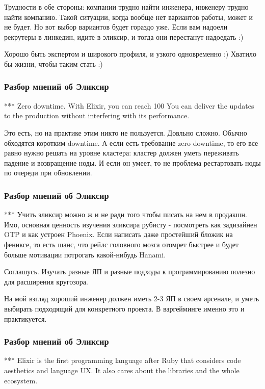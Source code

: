 \documentclass[10pt]{beamer}
\begin{document}
Трудности в обе стороны: компании трудно найти инженера, инженеру трудно найти компанию.
Такой ситуации, когда вообще нет вариантов работы, может и не будет. Но вот выбор вариантов будет гораздо уже.
Если вам надоели рекрутеры в линкедин, идите в эликсир, и тогда они перестанут надоедать :)

Хорошо быть экспертом и широкого профиля, и узкого одновременно :) Хватило бы жизни, чтобы таким стать :)


\begin{frame}
\frametitle{Разбор мнений об Эликсир}
\centering
\par \bigskip
\end{frame}

*** Zero downtime. With Elixir, you can reach 100%
You can deliver the updates to the production without interfering with its performance.

Это есть, но на практике этим никто не пользуется. Довльно сложно. Обычно обходятся коротким downtime.
А если есть требование zero downtime, то его все равно нужно решать на уровне кластера: кластер должен уметь переживать падение и возвращение ноды.
И если он умеет, то не проблема рестартовать ноды по очереди при обновлении.


\begin{frame}
\frametitle{Разбор мнений об Эликсир}
\centering
\par \bigskip
\end{frame}

*** Учить эликсир можно ж и не ради того чтобы писать на нем в продакшн.
Имо, основная ценность изучения эликсира рубисту - посмотреть как задизайнен OTP и как устроен Phoenix.
Если написать даже простейший бложик на фениксе, то есть шанс, что рейлс головного мозга отомрет быстрее и будет больше мотивации потрогать какой-нибудь Hanami.

Соглашусь. Изучать разные ЯП и разные подходы к программированию полезно для расширения кругозора.

На мой взгляд хороший инженер должен иметь 2-3 ЯП в своем арсенале, и уметь выбирать подходящий для конкретного проекта.
В варгейминге именно это и практикуется.


\begin{frame}
\frametitle{Разбор мнений об Эликсир}
\centering
\par \bigskip
\end{frame}

*** Elixir is the first programming language after Ruby that considers code aesthetics and language UX. It also cares about the libraries and the whole ecosystem.
\end{document}
